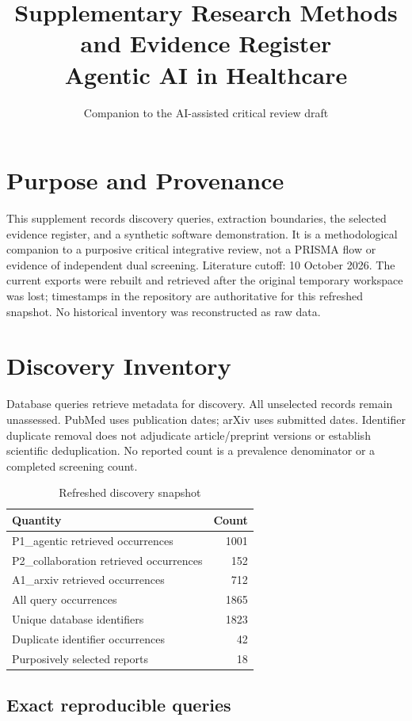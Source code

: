 \documentclass[journal,10pt]{IEEEtran}
\title{Supplementary Research Methods and Evidence Register\\Agentic AI in Healthcare}
\author{Companion to the AI-assisted critical review draft}
\begin{document}
\maketitle\raggedbottom{}
\section{Purpose and Provenance}
This supplement records discovery queries, extraction boundaries, the selected evidence register, and a synthetic software demonstration. It is a methodological companion to a purposive critical integrative review, not a PRISMA flow or evidence of independent dual screening. Literature cutoff: 10 October 2026. The current exports were rebuilt and retrieved after the original temporary workspace was lost; timestamps in the repository are authoritative for this refreshed snapshot. No historical inventory was reconstructed as raw data.
\section{Discovery Inventory}
Database queries retrieve metadata for discovery. All unselected records remain unassessed. PubMed uses publication dates; arXiv uses submitted dates. Identifier duplicate removal does not adjudicate article/preprint versions or establish scientific deduplication. No reported count is a prevalence denominator or a completed screening count.
\begin{table}[h]\caption{Refreshed discovery snapshot}\centering\footnotesize
\begin{tabularx}{\columnwidth}{@{}Yr@{}}\toprule
Quantity & Count\\\midrule
P1\_agentic retrieved occurrences & 1001\\
P2\_collaboration retrieved occurrences & 152\\
A1\_arxiv retrieved occurrences & 712\\
All query occurrences & 1865\\
Unique database identifiers & 1823\\
Duplicate identifier occurrences & 42\\
Purposively selected reports & 18\\
\bottomrule\end{tabularx}\end{table}
\subsection{Exact reproducible queries}
\end{document}
